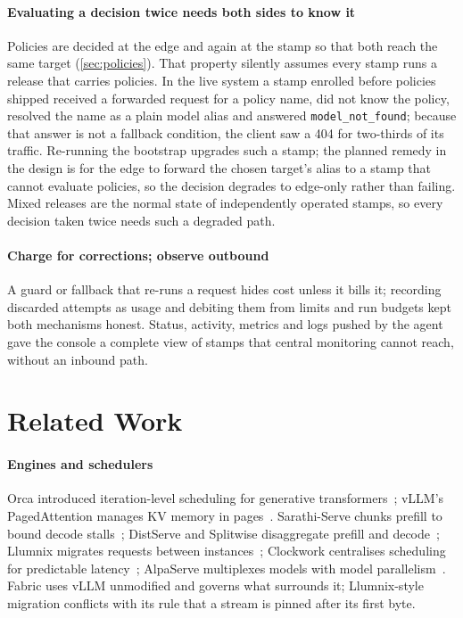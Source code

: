 \documentclass[conference,letterpaper]{IEEEtran}
\newcommand{\sys}{Fabric}
\newcommand{\code}[1]{\texttt{\small #1}}
\begin{document}
\paragraph*{Evaluating a decision twice needs both sides to know it}
Policies are decided at the edge and again at the stamp so that both reach the same target
(\cref{sec:policies}). That property silently assumes every stamp runs a release that carries
policies. In the live system a stamp enrolled before policies shipped received a forwarded request
for a policy name, did not know the policy, resolved the name as a plain model alias and answered
\code{model\_not\_found}; because that answer is not a fallback condition, the client saw a 404 for
two-thirds of its traffic. Re-running the bootstrap upgrades such a stamp; the planned remedy in
the design is for the edge to forward the chosen target's alias to a stamp that cannot evaluate
policies, so the decision degrades to edge-only rather than failing. Mixed releases are the normal
state of independently operated stamps, so every decision taken twice needs such a degraded path.

\paragraph*{Charge for corrections; observe outbound}
A guard or fallback that re-runs a request hides cost unless it bills it; recording discarded
attempts as usage and debiting them from limits and run budgets kept both mechanisms honest.
Status, activity, metrics and logs pushed by the agent gave the console a complete view of
stamps that central monitoring cannot reach, without an inbound path.

\section{Related Work}
\label{sec:related}

\paragraph*{Engines and schedulers}
Orca introduced iteration-level scheduling for generative transformers~\cite{orca}; vLLM's
PagedAttention manages KV memory in pages~\cite{vllm}. Sarathi-Serve chunks prefill to bound
decode stalls~\cite{sarathi}; DistServe and Splitwise disaggregate prefill and
decode~\cite{distserve,splitwise}; Llumnix migrates requests between instances~\cite{llumnix};
Clockwork centralises scheduling for predictable latency~\cite{clockwork}; AlpaServe multiplexes
models with model parallelism~\cite{alpaserve}. \sys{} uses vLLM unmodified and governs what
surrounds it; Llumnix-style migration conflicts with its rule that a stream is pinned after its
first byte.
\end{document}
